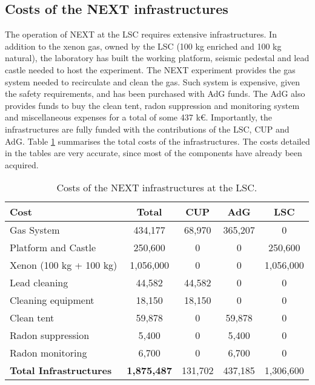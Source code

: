 \subsection{Costs of the NEXT infrastructures}
The operation of NEXT at the LSC requires extensive infrastructures. In addition to the xenon gas, owned by the LSC (100 kg enriched and 100 kg natural), the laboratory has built the working platform, seismic pedestal and lead castle needed to host the experiment. The NEXT experiment provides the gas system needed to recirculate and clean the gas. Such system is expensive, given the safety requirements, and has been purchased with AdG funds. The AdG also provides funds to buy the clean tent, radon suppression and monitoring system and miscellaneous expenses for a total of some
437 k\euro. Importantly, the infrastructures are fully funded with the contributions of the LSC, CUP and AdG. 
Table \ref{tab.n100:INFRA} summarises the total costs of the infrastructures. The costs detailed in the tables are very accurate, since most of the components have already been acquired. 


  
\begin{table}[h!]
\begin{center}
\begin{tabular}{|l|c|c|c|c|}
\hline
 Cost &	Total& 	CUP & AdG &  LSC \\
 \hline
Gas System &	434,177 &	 68,970 &	365,207 &	0 \\
Platform and Castle	& 250,600 & 	0	&0 &	250,600 \\
Xenon (100 kg + 100 kg)	& 1,056,000	& 0 &	0 & 1,056,000 \\
Lead cleaning	& 44,582 &44,582 &	0 & 0 \\
Cleaning equipment	& 18,150	& 18,150	& 0	& 0	\\
Clean tent	 & 59,878	&	0& 59,878 &	0	\\
Radon suppression 	& 5,400 &	0 &	5,400 &	0	\\
Radon monitoring &	6,700 &	0	& 6,700	& 0	\\
 \hline
{\bf Total Infrastructures} &	{\bf1,875,487}& 131,702 & 437,185 & 1,306,600 \\	
 \hline\hline
\end{tabular}  
\caption{Costs of the NEXT infrastructures at the LSC.}
\label{tab.n100:INFRA}
\end{center}
\end{table} 

